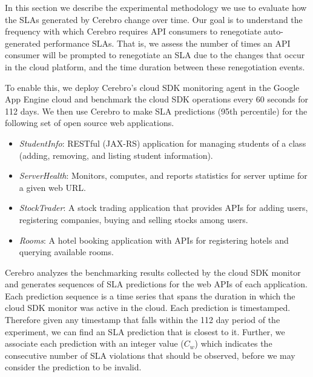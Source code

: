 In this section we describe the experimental methodology we use to evaluate how the SLAs
generated by Cerebro change over time. Our goal is to understand the frequency with
which Cerebro requires API consumers to renegotiate auto-generated performance SLAs. That is,
we assess the number of times an API consumer will be prompted to renegotiate an
SLA due to the changes that occur in the cloud platform, and the time duration
between these renegotiation events.

To enable this, we deploy Cerebro's cloud 
SDK monitoring agent in the Google App Engine cloud and benchmark
the cloud SDK operations every 60 seconds for 112 days. We then use Cerebro
to make SLA predictions (95th percentile) for the following set of open source web applications. 

\begin{itemize}
\vspace{-0.05in}
\item \textit{StudentInfo}: RESTful (JAX-RS) application for managing
students of a class (adding, removing, and listing student information).
\vspace{-0.05in}
\item \textit{ServerHealth}: Monitors, computes, and reports statistics for server
uptime for a given web URL.
\vspace{-0.05in}
\item \textit{StockTrader}: A stock trading application that
provides APIs for adding users, registering companies, buying and selling
stocks among users. 
\vspace{-0.05in}
\item \textit{Rooms}: A hotel booking application with APIs
for registering hotels and querying available rooms.
\vspace{-0.05in}
\end{itemize}

Cerebro analyzes the benchmarking results collected
by the cloud SDK monitor and generates sequences of SLA predictions for the web APIs of each
application. Each prediction sequence
is a time series that spans the duration in which the cloud SDK monitor was active
in the cloud. Each prediction is timestamped. Therefore given any timestamp that falls within the
112 day period of the experiment, we can find an SLA prediction that is closest to it. 
Further, we associate each prediction with an integer value ($C_{w}$) which indicates the consecutive 
number of SLA violations that should be
observed, before we may consider the prediction to be invalid. 


